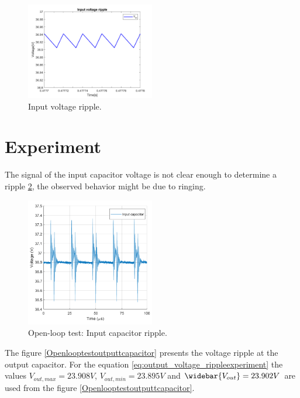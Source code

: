 \begin{figure}[H]
	\begin{center}
		\includegraphics[width=0.5\textwidth]{../Pictures/P1/Open_loop_simulation/open_loop_Vin_ripple.png}
		\caption{Input voltage ripple.}
		\label{fig:input_voltage_ripple}
	\end{center}	
\end{figure}

\section{Experiment}

The signal of the input capacitor voltage is not clear enough to determine a ripple \ref{Openlooptestinputcapacitor}, the observed behavior might be due to ringing.

\begin{figure}[H]
	\begin{center}
		\includegraphics[width=0.5\textwidth]{../Pictures/P1/Test/Openloopinputcapacitor}
		\caption{Open-loop test: Input capacitor ripple.}
		\label{Openlooptestinputcapacitor}
	\end{center}	
\end{figure}

The figure \ref{Openlooptestoutputtcapacitor} presents the voltage ripple at the output capacitor. For the equation \ref{eq:output_voltage_rippleexperiment} the values $V_{out,max} = 23.908V$, $V_{out,min} = 23.895V$ and $\widebar{V_{out}} = 23.902V$ are used from the figure  \ref{Openlooptestoutputtcapacitor}.

